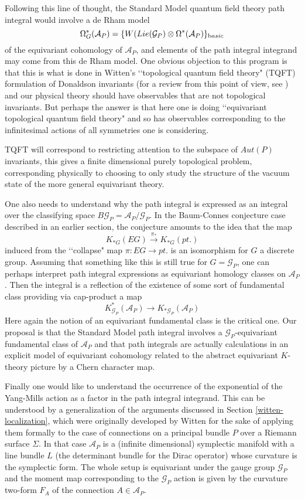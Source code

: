 \documentclass[a4paper,a4paper]{article}
\theoremstyle{conjecture}
\begin{document}
Following this line of thought, the Standard Model quantum field theory path integral
would involve a de Rham model
$$\Omega^*_G({\mathcal A}_P)=\{W(Lie({\mathcal G}_P)\otimes \Omega^*({\mathcal A}_P)\}_{\text basic}$$
of the equivariant cohomology of ${\mathcal A}_P$, and elements of
the path integral integrand may come from this de Rham model. One
obvious objection to this program is that this is what is done in
Witten's \lq\lq topological quantum field theory" (TQFT)
formulation of Donaldson invariants \cite{Witten-TQFT} (for a
review from this point of view, see \cite{Cordes-Moore-Ramgoolam})
and our physical theory should have observables that are not
topological invariants.  But perhaps the answer is that here one
is doing \lq\lq equivariant topological quantum field theory" and so has
observables corresponding to the infinitesimal actions of all
symmetries one is considering.  

TQFT will correspond to restricting attention to the subspace of $Aut(P)$ invariants,
this gives a finite dimensional purely topological problem, corresponding physically
to choosing to only study the structure of the vacuum state of the more general
equivariant theory.

One also needs to understand why the path integral is expressed as an integral over the classifying
space $B{\mathcal G}_P={\mathcal A}_P/{\mathcal G}_P$.  In the Baum-Connes conjecture case described
in an earlier section, the conjecture amounts to the idea that the map
$$K_{*G}(EG)\stackrel{\pi_*}\rightarrow K_{*G}(pt.)$$
induced from the \lq\lq collapse" map $\pi : EG\rightarrow pt.$ is an isomorphism for $G$ a discrete group.
Assuming that something like this is still true for $G={\mathcal G}_P$, one
can perhaps interpret path integral expressions as equivariant homology classes on ${\mathcal A}_P$.  Then
the integral is a reflection of the existence of some sort of fundamental class providing via cap-product
a map
$$K^*_{{\mathcal G}_P}({\mathcal A}_P)\rightarrow K_{*{\mathcal G}_P}({\mathcal A}_P)$$
Here again the notion of an equivariant fundamental class is the critical one. Our proposal is that the
Standard Model path integral involves a ${\mathcal G}_P$-equivariant fundamental class of
${\mathcal A}_P$ and that path integrals are actually calculations in an explicit model of
equivariant cohomology related to the abstract equivariant $K$-theory picture by a Chern character map.

Finally one would like to understand the occurrence of the
exponential of the Yang-Mills action as a factor in the path
integral integrand.  This can be understood by
a generalization of the arguments discussed in Section
\ref{witten-localization}, which were
originally developed by Witten for the sake of applying them
formally to the case of connections on a principal bundle $P$ over
a Riemann surface $\Sigma$.  In that case ${\mathcal A}_P$ is a
(infinite dimensional) symplectic manifold with a line bundle $L$
(the determinant bundle for the Dirac operator) whose curvature is
the symplectic form. The whole setup is equivariant under the
gauge group ${\mathcal G}_P$ and the moment map corresponding to
the ${\mathcal G}_P$ action is given by the curvature two-form
$F_A$ of the connection $A\in{\mathcal A}_P$.  
\end{document}
